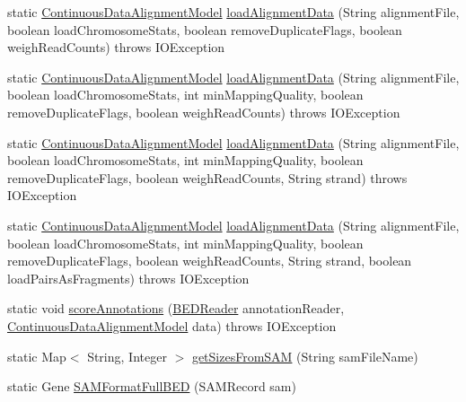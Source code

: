 \begin{DoxyCompactItemize}
\item 
static \hyperlink{classbroad_1_1pda_1_1seq_1_1segmentation_1_1_continuous_data_alignment_model}{Continuous\+Data\+Alignment\+Model} \hyperlink{classbroad_1_1pda_1_1seq_1_1alignment_1_1_alignment_utils_ad098b0d98d37c3e070b667882b9f3132}{load\+Alignment\+Data} (String alignment\+File, boolean load\+Chromosome\+Stats, boolean remove\+Duplicate\+Flags, boolean weigh\+Read\+Counts)  throws I\+O\+Exception 
\item 
static \hyperlink{classbroad_1_1pda_1_1seq_1_1segmentation_1_1_continuous_data_alignment_model}{Continuous\+Data\+Alignment\+Model} \hyperlink{classbroad_1_1pda_1_1seq_1_1alignment_1_1_alignment_utils_ae407b9daa11a4ab33155c1c221dac929}{load\+Alignment\+Data} (String alignment\+File, boolean load\+Chromosome\+Stats, int min\+Mapping\+Quality, boolean remove\+Duplicate\+Flags, boolean weigh\+Read\+Counts)  throws I\+O\+Exception 
\item 
static \hyperlink{classbroad_1_1pda_1_1seq_1_1segmentation_1_1_continuous_data_alignment_model}{Continuous\+Data\+Alignment\+Model} \hyperlink{classbroad_1_1pda_1_1seq_1_1alignment_1_1_alignment_utils_a26be40597246795138bcf13da2ea1b9b}{load\+Alignment\+Data} (String alignment\+File, boolean load\+Chromosome\+Stats, int min\+Mapping\+Quality, boolean remove\+Duplicate\+Flags, boolean weigh\+Read\+Counts, String strand)  throws I\+O\+Exception 
\item 
static \hyperlink{classbroad_1_1pda_1_1seq_1_1segmentation_1_1_continuous_data_alignment_model}{Continuous\+Data\+Alignment\+Model} \hyperlink{classbroad_1_1pda_1_1seq_1_1alignment_1_1_alignment_utils_a4c8b2eacf9a07b744b6da702067a6ba4}{load\+Alignment\+Data} (String alignment\+File, boolean load\+Chromosome\+Stats, int min\+Mapping\+Quality, boolean remove\+Duplicate\+Flags, boolean weigh\+Read\+Counts, String strand, boolean load\+Pairs\+As\+Fragments)  throws I\+O\+Exception 
\item 
static void \hyperlink{classbroad_1_1pda_1_1seq_1_1alignment_1_1_alignment_utils_a6c939ca293f7fbfd141d81c1534a8461}{score\+Annotations} (\hyperlink{classbroad_1_1core_1_1annotation_1_1_b_e_d_reader}{B\+E\+D\+Reader} annotation\+Reader, \hyperlink{classbroad_1_1pda_1_1seq_1_1segmentation_1_1_continuous_data_alignment_model}{Continuous\+Data\+Alignment\+Model} data)  throws I\+O\+Exception 
\item 
static Map$<$ String, Integer $>$ \hyperlink{classbroad_1_1pda_1_1seq_1_1alignment_1_1_alignment_utils_aaaae3d6e8f7f451a772f432a8414f4a2}{get\+Sizes\+From\+S\+A\+M} (String sam\+File\+Name)
\item 
static Gene \hyperlink{classbroad_1_1pda_1_1seq_1_1alignment_1_1_alignment_utils_a88b4e4f173dd90784c6fe117156773c6}{S\+A\+M\+Format\+Full\+B\+E\+D} (S\+A\+M\+Record sam)
\end{DoxyCompactItemize}


